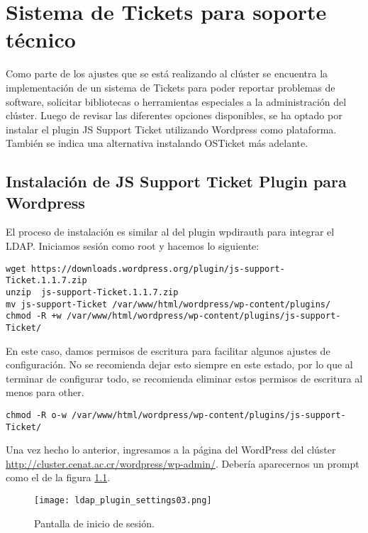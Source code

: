 \chapter{Sistema de Tickets para soporte técnico}
Como parte de los ajustes  que se está realizando al clúster se encuentra la implementación de un sistema de Tickets para poder reportar problemas  de software, solicitar bibliotecas o  herramientas especiales a la administración del clúster. Luego de revisar las diferentes opciones disponibles, se ha optado por instalar el plugin JS Support Ticket  \cite{pluginTicket} utilizando Wordpress como plataforma. También se indica una alternativa instalando OSTicket más adelante. 

\section{Instalación de JS Support Ticket Plugin para Wordpress}
El proceso de instalación es similar al del plugin wpdirauth para integrar el LDAP. Iniciamos sesión como root y hacemos lo siguiente:
\begin{lstlisting} 
wget https://downloads.wordpress.org/plugin/js-support-Ticket.1.1.7.zip
unzip  js-support-Ticket.1.1.7.zip
mv js-support-Ticket /var/www/html/wordpress/wp-content/plugins/
chmod -R +w /var/www/html/wordpress/wp-content/plugins/js-support-Ticket/
\end{lstlisting}
En este caso,  damos permisos de escritura para  facilitar algunos ajustes de configuración. No se recomienda dejar esto siempre en este estado, por lo que al terminar de configurar todo, se recomienda eliminar estos permisos de escritura al menos para other.
\begin{lstlisting} 
chmod -R o-w /var/www/html/wordpress/wp-content/plugins/js-support-Ticket/
\end{lstlisting}
Una vez hecho lo anterior, ingresamos a la página del WordPress del clúster \url{http://cluster.cenat.ac.cr/wordpress/wp-admin/}. Debería aparecernos un prompt como el de la figura \ref{fig:js:01}.
\begin{figure}[H]
\centering
\texttt{[image: ldap\_plugin\_settings03.png]}
\caption{Pantalla de inicio de sesión.}
\label{fig:js:01}
\end{figure}
